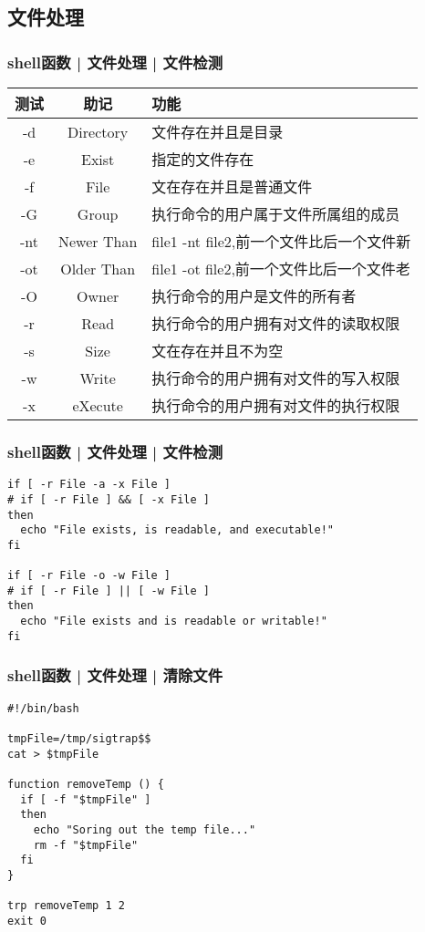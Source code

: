 \subsection{文件处理}
\begin{frame}
  \frametitle{shell函数 | 文件处理 | \alert{文件检测}}
  \begin{table}
    \centering
    \begin{tabularx}{\textwidth}{ccX}
      \hline
      \rowcolor{blue!50}测试 & 助记 & 功能\\
      \hline
      -d & Directory & 文件存在并且是目录\\
      -e & Exist & 指定的文件存在\\
      -f & File & 文在存在并且是普通文件\\
      -G & Group & 执行命令的用户属于文件所属组的成员\\
      -nt & Newer Than & file1 -nt file2,前一个文件比后一个文件新\\
      -ot & Older Than & file1 -ot file2,前一个文件比后一个文件老\\
      -O & Owner & 执行命令的用户是文件的所有者\\
      -r & Read & 执行命令的用户拥有对文件的读取权限\\
      -s & Size & 文在存在并且不为空\\
      -w & Write & 执行命令的用户拥有对文件的写入权限\\
      -x & eXecute & 执行命令的用户拥有对文件的执行权限\\
      \hline
    \end{tabularx}
  \end{table}
\end{frame}

\begin{frame}[fragile]
  \frametitle{shell函数 | 文件处理 | \alert{文件检测}}
\begin{lstlisting}
if [ -r File -a -x File ]
# if [ -r File ] && [ -x File ]
then
  echo "File exists, is readable, and executable!"
fi

if [ -r File -o -w File ]
# if [ -r File ] || [ -w File ]
then
  echo "File exists and is readable or writable!"
fi
\end{lstlisting}
\end{frame}

\begin{frame}[fragile]
  \frametitle{shell函数 | 文件处理 | 清除文件}
\begin{lstlisting}
#!/bin/bash

tmpFile=/tmp/sigtrap$$
cat > $tmpFile

function removeTemp () {
  if [ -f "$tmpFile" ]
  then
    echo "Soring out the temp file..."
    rm -f "$tmpFile"
  fi
}

trp removeTemp 1 2
exit 0
\end{lstlisting}
\end{frame}

